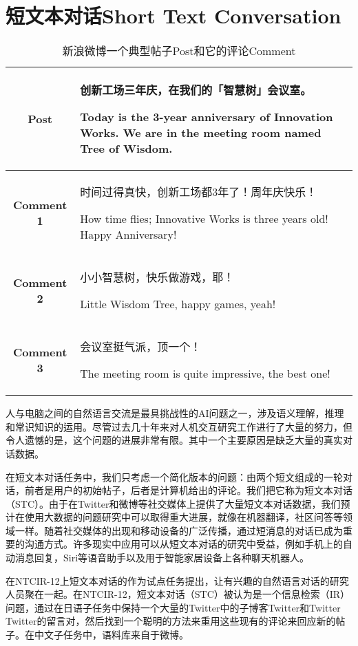 \chapter{短文本对话Short Text Conversation}

\begin{table}[htbp]
\centering
\caption{新浪微博一个典型帖子Post和它的评论Comment} \label{tab:example_STC}
\begin{tabular}{|c|p{10cm}|}
    \hline
    \textbf{Post} & 创新工场三年庆，在我们的「智慧树」会议室。\par Today is the 3-year anniversary of Innovation Works. We are in the meeting room named Tree of Wisdom.  \\
    \hline
    \textbf{Comment 1} & 时间过得真快，创新工场都3年了！周年庆快乐！\par How time flies; Innovative Works is three years old! Happy Anniversary!\\
    \hline
	\textbf{Comment 2} & 小小智慧树，快乐做游戏，耶！\par Little Wisdom Tree, happy games, yeah! \\
	\hline
	\textbf{Comment 3} & 会议室挺气派，顶一个！\par The meeting room is quite impressive, the best one! \\
	\hline
\end{tabular}
\end{table}
人与电脑之间的自然语言交流是最具挑战性的AI问题之一，涉及语义理解，推理和常识知识的运用。尽管过去几十年来对人机交互研究工作进行了大量的努力，但令人遗憾的是，这个问题的进展非常有限。其中一个主要原因是缺乏大量的真实对话数据。

在短文本对话任务中，我们只考虑一个简化版本的问题：由两个短文组成的一轮对话，前者是用户的初始帖子，后者是计算机给出的评论。我们把它称为短文本对话（STC）。由于在Twitter和微博等社交媒体上提供了大量短文本对话数据，我们预计在使用大数据的问题研究中可以取得重大进展，就像在机器翻译，社区问答等领域一样。随着社交媒体的出现和移动设备的广泛传播，通过短消息的对话已成为重要的沟通方式。许多现实中应用可以从短文本对话的研究中受益，例如手机上的自动消息回复，Siri等语音助手以及用于智能家居设备上各种聊天机器人。

在NTCIR-12上短文本对话的作为试点任务提出，让有兴趣的自然语言对话的研究人员聚在一起。在NTCIR-12，短文本对话（STC）被认为是一个信息检索（IR）问题，通过在日语子任务中保持一个大量的Twitter中的子博客Twitter和Twitter Twitter的留言对，然后找到一个聪明的方法来重用这些现有的评论来回应新的帖子。在中文子任务中，语料库来自于微博。

